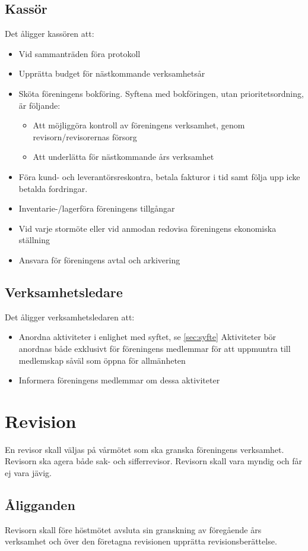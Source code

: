 \documentclass[11pt,a4paper]{article}
\begin{document}
\subsection{Kassör}\label{sec:cash}
Det åligger kassören att:
\begin{itemize}
	\item Vid sammanträden föra protokoll
	\item Upprätta budget för nästkommande verksamhetsår
	\item Sköta föreningens bokföring. Syftena med bokföringen, utan prioritetsordning, är följande:
\begin{itemize}
	\item Att möjliggöra kontroll av föreningens verksamhet, genom revisorn/revisorernas försorg
	\item Att underlätta för nästkommande års verksamhet
\end{itemize}
\item Föra kund- och leverantörsreskontra, betala fakturor i tid samt följa upp icke betalda fordringar.
\item Inventarie-/lagerföra föreningens tillgångar
\item Vid varje stormöte eller vid anmodan redovisa föreningens ekonomiska ställning
\item Ansvara för föreningens avtal och arkivering
\end{itemize}
\subsection{Verksamhetsledare}\label{sec:event}
Det åligger verksamhetsledaren att:
\begin{itemize}
\item Anordna aktiviteter i enlighet med syftet, se \ref{sec:syfte} Aktiviteter bör anordnas både exklusivt för föreningens medlemmar för att uppmuntra till medlemskap såväl som öppna för allmänheten
\item Informera föreningens medlemmar om dessa aktiviteter
\end{itemize}

\section{Revision}
En revisor skall väljas på vårmötet som ska granska föreningens verksamhet. Revisorn ska agera både sak- och sifferrevisor. Revisorn skall vara myndig och får ej vara jävig.
\subsection{Åligganden}
Revisorn skall före höstmötet avsluta sin granskning av föregående års verksamhet och över den företagna revisionen upprätta revisionsberättelse.
\end{document}
